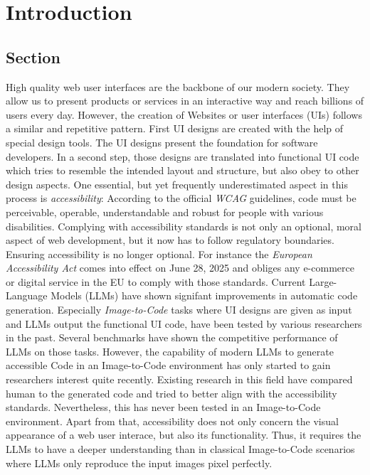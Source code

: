 
\chapter{Introduction}\label{chapter:introduction}

\section{Section}
High quality web user interfaces are the backbone of our modern society. They allow us 
to present products or services in an interactive way and reach billions of users every day.
However, the creation of Websites or user interfaces (UIs) follows a similar and repetitive 
pattern. \newline
First UI designs are created with the help of special design tools. The UI designs present 
the foundation for software developers. In a second step, those designs are translated into 
functional UI code which tries to resemble the intended layout and structure, but also obey
to other design aspects. \newline
One essential, but yet frequently underestimated aspect in this process is \textit{accessibility}:
According to the official \textit{WCAG} guidelines, code must be  perceivable, operable, 
understandable and robust for people with various disabilities.\newline
Complying with accessibility standards is not only an optional, moral aspect of 
web development, but it now has to follow regulatory boundaries. Ensuring accessibility
is no longer optional. For instance the \textit{European Accessibility Act} comes into 
effect on June 28, 2025 and obliges any e-commerce or digital service in the EU 
to comply with those standards.\newline
Current Large-Language Models (LLMs) have shown signifant improvements in automatic
code generation. Especially \textit{Image-to-Code} tasks where UI designs are given as 
input and LLMs output the functional UI code, have been tested by various researchers in 
the past. Several benchmarks have shown the competitive performance of LLMs on those tasks.
However, the capability of modern LLMs to generate accessible Code in an Image-to-Code 
environment has only started to gain researchers interest quite recently. Existing 
research in this field have compared human to the generated code and tried to better
align with the accessibility standards. Nevertheless, this has never been tested in 
an Image-to-Code environment. Apart from that, accessibility does not only concern 
the visual appearance of a web user interace, but also its functionality. Thus, it 
requires the LLMs to have a deeper understanding than in classical Image-to-Code scenarios
where LLMs only reproduce the input images pixel perfectly.

